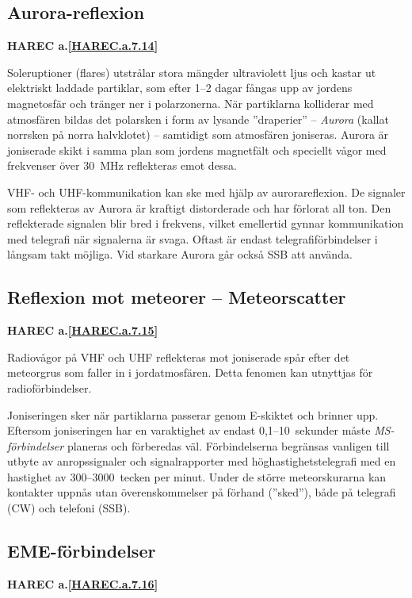 \subsection{Aurora-reflexion}
\textbf{
HAREC a.\ref{HAREC.a.7.14}\label{myHAREC.a.7.14}
}

Soleruptioner (flares) utstrålar stora mängder ultraviolett ljus och
kastar ut elektriskt laddade partiklar, som efter 1--2 dagar fångas upp
av jordens magnetosfär och tränger ner i polarzonerna.
När partiklarna kolliderar med atmosfären bildas det polarsken i form av lysande
''draperier'' -- \emph{Aurora} (kallat norrsken på norra halvklotet) --
samtidigt
som atmosfären joniseras.
Aurora är joniserade skikt i samma plan som jordens magnetfält och speciellt
vågor med frekvenser över 30~MHz reflekteras emot dessa.

VHF- och UHF-kommunikation kan ske med hjälp av aurorareflexion.
De signaler som reflekteras av Aurora är kraftigt distorderade och har
förlorat all ton.
Den reflekterade signalen blir bred i frekvens, vilket emellertid gynnar
kommunikation med telegrafi när signalerna är svaga.
Oftast är endast telegrafiförbindelser i långsam takt möjliga.
Vid starkare Aurora går också SSB att använda.

\subsection{Reflexion mot meteorer -- Meteorscatter}
\textbf{
HAREC a.\ref{HAREC.a.7.15}\label{myHAREC.a.7.15}
}

Radiovågor på VHF och UHF reflekteras mot joniserade spår efter det
meteorgrus som faller in i jordatmosfären.
Detta fenomen kan utnyttjas för radioförbindelser.

Joniseringen sker när partiklarna passerar genom E-skiktet och brinner upp.
Eftersom joniseringen har en varaktighet av endast 0,1--10~sekunder måste
\emph{MS-förbindelser} planeras och förberedas väl.
Förbindelserna begränsas vanligen till utbyte av anropssignaler och
signalrapporter med höghastighetstelegrafi med en hastighet av
300--3000~tecken per minut.
Under de större meteorskurarna kan kontakter uppnås utan överenskommelser på
förhand (''sked''), både på telegrafi (CW) och telefoni (SSB).

\subsection{EME-förbindelser}
\textbf{
HAREC a.\ref{HAREC.a.7.16}\label{myHAREC.a.7.16}
}

